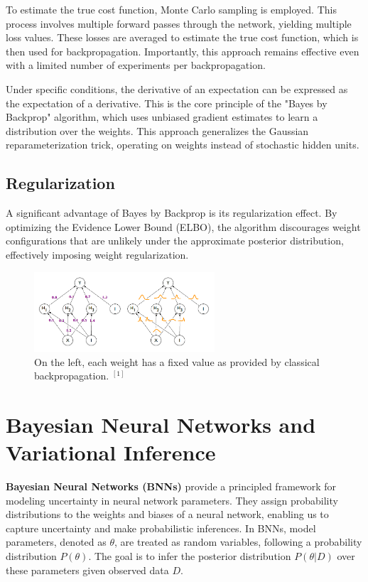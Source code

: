 \documentclass{article}
\begin{document}
To estimate the true cost function, Monte Carlo sampling is employed. This process involves multiple forward passes through the network, yielding multiple loss values. These losses are averaged to estimate the true cost function, which is then used for backpropagation. Importantly, this approach remains effective even with a limited number of experiments per backpropagation.

Under specific conditions, the derivative of an expectation can be expressed as the expectation of a derivative. This is the core principle of the "Bayes by Backprop" algorithm, which uses unbiased gradient estimates to learn a distribution over the weights. This approach generalizes the Gaussian reparameterization trick, operating on weights instead of stochastic hidden units.

\subsection{Regularization}

A significant advantage of Bayes by Backprop is its regularization effect. By optimizing the Evidence Lower Bound (ELBO), the algorithm discourages weight configurations that are unlikely under the approximate posterior distribution, effectively imposing weight regularization.

\begin{figure}
    \centering
    \includegraphics[width=0.6\textwidth]{image.png}
    \caption{On the left, each weight has a fixed value as provided by classical backpropagation. $^{[1]}$}
\end{figure}

\section{Bayesian Neural Networks and Variational Inference}

\textbf{Bayesian Neural Networks (BNNs)} provide a principled framework for modeling uncertainty in neural network parameters. They assign probability distributions to the weights and biases of a neural network, enabling us to capture uncertainty and make probabilistic inferences. In BNNs, model parameters, denoted as $\theta$, are treated as random variables, following a probability distribution $P(\theta)$. The goal is to infer the posterior distribution $P(\theta|D)$ over these parameters given observed data $D$.
\end{document}
